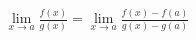 \documentclass[preview]{standalone}
\begin{document}
\begin{align*}
\lim_{x \to a} \frac{f(x)}{g(x)} = \lim_{x \to a} \frac{f(x) - f(a)}{g(x) - g(a)}
\end{align*}
\end{document}
